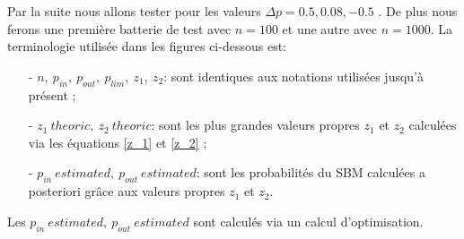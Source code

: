 Par la suite nous allons tester pour les valeurs $\Delta p= 0.5, 0.08, -0.5$ .
De plus nous ferons une première batterie de test avec $n=100$ et une autre avec $n=1000$.
La terminologie utilisée dans les figures ci-dessous est:
\begin{itemize}
	\item[- \underline{$n,\: p_{in},\: p_{out},\: p_{lim},\: z_1,\: z_2$}:] sont identiques aux notations utilisées jusqu'à présent ;
	\item[- \underline{$z_1\: theoric, \:z_2\: theoric$}:] sont les plus grandes valeurs propres $z_1$ et $z_2$ calculées via les équations \eqref{z_1} et \eqref{z_2} ;    
	\item[- \underline{$p_{in}\: estimated, \:p_{out}\: estimated$}:] sont les probabilités du SBM calculées a posteriori grâce aux valeurs propres $z_1$ et $z_2$.\\
\end{itemize}
Les $p_{in}\: estimated, \:p_{out}\: estimated$ sont calculés via un calcul d'optimisation.\\

